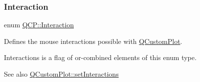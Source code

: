 \subsubsection{\texorpdfstring{Interaction}{Interaction}}
{\footnotesize\ttfamily enum \mbox{\hyperlink{namespace_q_c_p_a2ad6bb6281c7c2d593d4277b44c2b037}{Q\+C\+P\+::\+Interaction}}}

Defines the mouse interactions possible with \mbox{\hyperlink{class_q_custom_plot}{Q\+Custom\+Plot}}.

{\ttfamily Interactions} is a flag of or-\/combined elements of this enum type.

\begin{DoxySeeAlso}{See also}
\mbox{\hyperlink{class_q_custom_plot_a5ee1e2f6ae27419deca53e75907c27e5}{Q\+Custom\+Plot\+::set\+Interactions}} 
\end{DoxySeeAlso}
